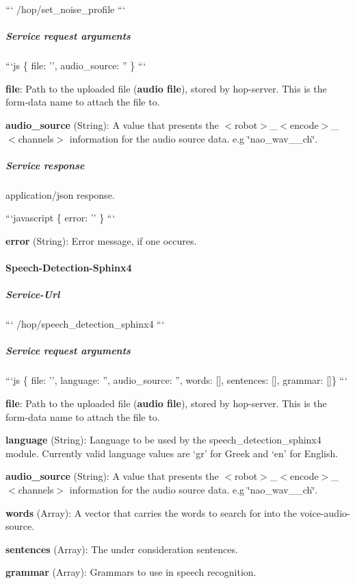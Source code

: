 ``` /hop/set\-\_\-noise\-\_\-profile ```

\subparagraph*{Service request arguments}

```js \{ file\-: '', audio\-\_\-source\-: '' \} ```


\begin{DoxyItemize}
\item {\bfseries file}\-: Path to the uploaded file ({\bfseries audio file}), stored by hop-\/server. This is the form-\/data name to attach the file to.
\item {\bfseries audio\-\_\-source} (String)\-: A value that presents the $<$robot$>$\-\_\-$<$encode$>$\-\_\-$<$channels$>$ information for the audio source data. e.\-g \char`\"{}nao\-\_\-wav\-\_\-\_\-ch\char`\"{}.
\end{DoxyItemize}

\subparagraph*{Service response}

application/json response.

```javascript \{ error\-: '' \} ```


\begin{DoxyItemize}
\item {\bfseries error} (String)\-: Error message, if one occures.
\end{DoxyItemize}

\paragraph*{Speech-\/\-Detection-\/\-Sphinx4}

\subparagraph*{Service-\/\-Url}

``` /hop/speech\-\_\-detection\-\_\-sphinx4 ```

\subparagraph*{Service request arguments}

```js \{ file\-: '', language\-: '', audio\-\_\-source\-: '', words\-: \mbox{[}\mbox{]}, sentences\-: \mbox{[}\mbox{]}, grammar\-: \mbox{[}\mbox{]}\} ```


\begin{DoxyItemize}
\item {\bfseries file}\-: Path to the uploaded file ({\bfseries audio file}), stored by hop-\/server. This is the form-\/data name to attach the file to.
\item {\bfseries language} (String)\-: Language to be used by the speech\-\_\-detection\-\_\-sphinx4 module. Currently valid language values are ‘gr’ for Greek and ‘en’ for English.
\item {\bfseries audio\-\_\-source} (String)\-: A value that presents the $<$robot$>$\-\_\-$<$encode$>$\-\_\-$<$channels$>$ information for the audio source data. e.\-g \char`\"{}nao\-\_\-wav\-\_\-\_\-ch\char`\"{}.
\item {\bfseries words} (Array)\-: A vector that carries the words to search for into the voice-\/audio-\/source.
\item {\bfseries sentences} (Array)\-: The under consideration sentences.
\item {\bfseries grammar} (Array)\-: Grammars to use in speech recognition.
\end{DoxyItemize}

